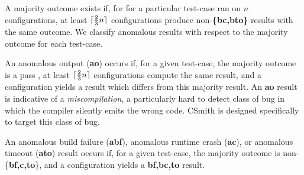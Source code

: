 A majority outcome exists if, for for a particular test-case ran on $n$ configurations, at least $\lceil\frac{2}{3}n\rceil$ configurations produce non-\textbf{\{bc,bto\}} results with the same outcome. We classify anomalous results with respect to the majority outcome for each test-case.

An anomalous output (\textbf{ao}) occurs if, for a given test-case, the majority outcome is a pass \textbf{\cmark}, at least $\lceil\frac{2}{3}n\rceil$ configurations compute the same result, and a configuration yields a result which differs from this majority result. An \textbf{ao} result is indicative of a \emph{miscompilation}, a particularly hard to detect class of bug in which the compiler silently emits the wrong code. CSmith is designed specifically to target this class of bug.

An anomalous build failure (\textbf{abf}), anomalous runtime crash (\textbf{ac}), or anomalous timeout (\textbf{ato}) result occurs if, for a given test-case, the majority outcome is non-\{\textbf{bf,c,to}\}, and a configuration yields a \textbf{bf,bc,to} result.


%


